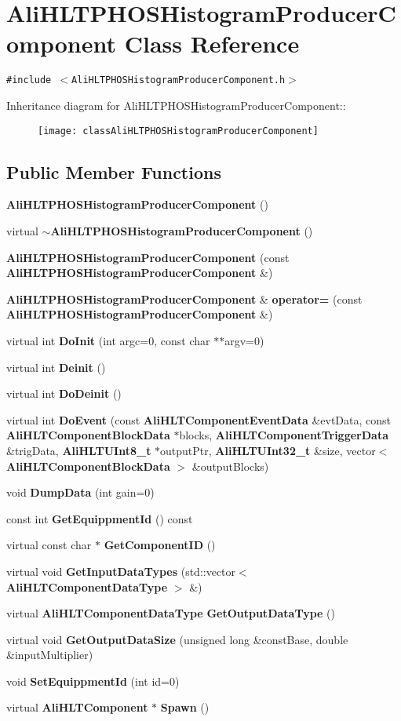 \section{Ali\-HLTPHOSHistogram\-Producer\-Component Class Reference}
\label{classAliHLTPHOSHistogramProducerComponent}
{\tt \#include $<$Ali\-HLTPHOSHistogram\-Producer\-Component.h$>$}

Inheritance diagram for Ali\-HLTPHOSHistogram\-Producer\-Component::\begin{figure}[H]
\begin{center}
\leavevmode
\texttt{[image: classAliHLTPHOSHistogramProducerComponent]}
\end{center}
\end{figure}
\subsection*{Public Member Functions}
\begin{CompactItemize}
\item 
{\bf Ali\-HLTPHOSHistogram\-Producer\-Component} ()
\item 
virtual {\bf $\sim$Ali\-HLTPHOSHistogram\-Producer\-Component} ()
\item 
{\bf Ali\-HLTPHOSHistogram\-Producer\-Component} (const {\bf Ali\-HLTPHOSHistogram\-Producer\-Component} \&)
\item 
{\bf Ali\-HLTPHOSHistogram\-Producer\-Component} \& {\bf operator=} (const {\bf Ali\-HLTPHOSHistogram\-Producer\-Component} \&)
\item 
virtual int {\bf Do\-Init} (int argc=0, const char $\ast$$\ast$argv=0)
\item 
virtual int {\bf Deinit} ()
\item 
virtual int {\bf Do\-Deinit} ()
\item 
virtual int {\bf Do\-Event} (const {\bf Ali\-HLTComponent\-Event\-Data} \&evt\-Data, const {\bf Ali\-HLTComponent\-Block\-Data} $\ast$blocks, {\bf Ali\-HLTComponent\-Trigger\-Data} \&trig\-Data, {\bf Ali\-HLTUInt8\_\-t} $\ast$output\-Ptr, {\bf Ali\-HLTUInt32\_\-t} \&size, vector$<$ {\bf Ali\-HLTComponent\-Block\-Data} $>$ \&output\-Blocks)
\item 
void {\bf Dump\-Data} (int gain=0)
\item 
const int {\bf Get\-Equippment\-Id} () const 
\item 
virtual const char $\ast$ {\bf Get\-Component\-ID} ()
\item 
virtual void {\bf Get\-Input\-Data\-Types} (std::vector$<$ {\bf Ali\-HLTComponent\-Data\-Type} $>$ \&)
\item 
virtual {\bf Ali\-HLTComponent\-Data\-Type} {\bf Get\-Output\-Data\-Type} ()
\item 
virtual void {\bf Get\-Output\-Data\-Size} (unsigned long \&const\-Base, double \&input\-Multiplier)
\item 
void {\bf Set\-Equippment\-Id} (int id=0)
\item 
virtual {\bf Ali\-HLTComponent} $\ast$ {\bf Spawn} ()
\end{CompactItemize}
